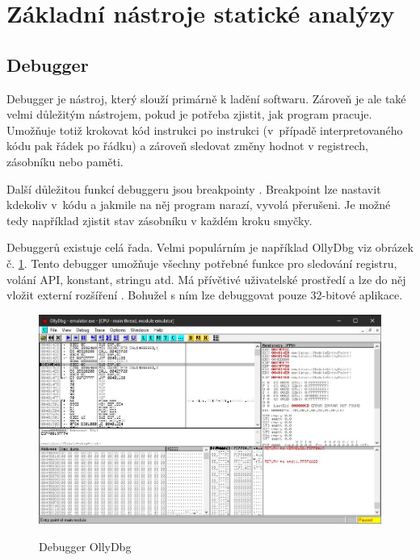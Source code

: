 \section{Základní nástroje statické analýzy}

\subsection{Debugger}

Debugger je nástroj, který slouží primárně k ladění softwaru. Zároveň je ale také velmi důležitým nástrojem, pokud je potřeba zjistit, jak program pracuje. Umožňuje totiž krokovat kód instrukci po instrukci (v~případě interpretovaného kódu pak řádek po řádku) a zároveň sledovat změny hodnot v registrech, zásobníku nebo paměti.

Další důležitou funkcí debuggeru jsou breakpointy \cite{debugger_dissasembler}. Breakpoint lze nastavit kdekoliv v~kódu a jakmile na něj program narazí, vyvolá přerušeni. Je možné tedy například zjistit stav zásobníku v každém kroku smyčky.

Debuggerů existuje celá řada. Velmi populárním je například OllyDbg viz obrázek č. \ref{fig:olldbg}. Tento debugger umožňuje všechny potřebné funkce pro sledování registru, volání API, konstant, stringu atd. Má přívětivé uživatelské prostředí a lze do něj vložit externí rozšíření \cite{ollydbg}. Bohužel s ním lze debuggovat pouze 32-bitové aplikace.

\begin{figure}[!ht]
    \centering
    \caption{Debugger OllyDbg}
    \includegraphics[width=140mm,scale=0.5]{Figures/obrazky/OllyDbg.jpg}
    \label{fig:olldbg}
\end{figure}

